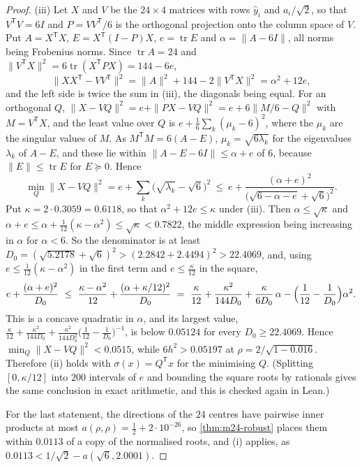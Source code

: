 \documentclass[11pt,reqno]{amsart}
\renewcommand{\_}{\origunderscore\allowbreak}
\numberwithin{equation}{section}
\theoremstyle{plain}
\theoremstyle{definition}
\theoremstyle{remark}
\begin{document}
\begin{proof}
(iii) Let $X$ and $V$ be the $24\times4$ matrices with rows $\hat y_i$ and
$a_i/\sqrt2$, so that $V^{\mathsf T}V=6I$ and $P=VV^{\mathsf T}/6$ is the
orthogonal projection onto the column space of $V$. Put $A=X^{\mathsf T}X$,
$E=X^{\mathsf T}(I-P)X$, $e=\operatorname{tr}E$ and $\alpha=\|A-6I\|$, all
norms being Frobenius norms. Since $\operatorname{tr}A=24$ and
$\|V^{\mathsf T}X\|^2=6\operatorname{tr}(X^{\mathsf T}PX)=144-6e$,
\[
  \|XX^{\mathsf T}-VV^{\mathsf T}\|^2=\|A\|^2+144-2\|V^{\mathsf T}X\|^2
  =\alpha^2+12e ,
\]
and the left side is twice the sum in \textup{(iii)}, the diagonals being
equal. For an orthogonal $Q$, $\|X-VQ\|^2=e+\|PX-VQ\|^2=e+6\|M/6-Q\|^2$ with
$M=V^{\mathsf T}X$, and the least value over $Q$ is
$e+\frac16\sum_k(\mu_k-6)^2$, where the $\mu_k$ are the singular values of
$M$. As $M^{\mathsf T}M=6(A-E)$, $\mu_k=\sqrt{6\lambda_k}$ for the
eigenvalues $\lambda_k$ of $A-E$, and these lie within
$\|A-E-6I\|\le\alpha+e$ of $6$, because $\|E\|\le\operatorname{tr}E$ for
$E\succeq0$. Hence
\[
  \min_Q\|X-VQ\|^2=e+\sum_k\bigl(\sqrt{\lambda_k}-\sqrt6\bigr)^2
  \ \le\ e+\frac{(\alpha+e)^2}{\bigl(\sqrt{6-\alpha-e}+\sqrt6\bigr)^2}.
\]
Put $\kappa=2\cdot0.3059=0.6118$, so that $\alpha^2+12e\le\kappa$ under
\textup{(iii)}. Then $\alpha\le\sqrt\kappa$ and
$\alpha+e\le\alpha+\frac1{12}(\kappa-\alpha^2)\le\sqrt\kappa<0.7822$, the
middle expression being increasing in $\alpha$ for $\alpha<6$. So the
denominator is at least
$D_0=(\sqrt{5.2178}+\sqrt6)^2>(2.2842+2.4494)^2>22.4069$, and, using
$e\le\frac1{12}(\kappa-\alpha^2)$ in the first term and $e\le\frac\kappa{12}$
in the square,
\[
  e+\frac{(\alpha+e)^2}{D_0}
  \ \le\ \frac{\kappa-\alpha^2}{12}+\frac{(\alpha+\kappa/12)^2}{D_0}
  \ =\ \frac\kappa{12}+\frac{\kappa^2}{144D_0}+\frac{\kappa}{6D_0}\,\alpha
  -\Bigl(\frac1{12}-\frac1{D_0}\Bigr)\alpha^2 .
\]
This is a concave quadratic in $\alpha$, and its largest value,
$\frac\kappa{12}+\frac{\kappa^2}{144D_0}
+\frac{\kappa^2}{144D_0^2}\bigl(\frac1{12}-\frac1{D_0}\bigr)^{-1}$, is below
$0.05124$ for every $D_0\ge22.4069$. Hence
$\min_Q\|X-VQ\|^2<0.0515$, while $6h^2>0.05197$ at
$\rho=2/\sqrt{1-0.016}$. Therefore \textup{(ii)} holds with
$\sigma(x)=Q^{\mathsf T}x$ for the minimising $Q$. (Splitting
$[0,\kappa/12]$ into $200$ intervals of $e$ and bounding the square roots by
rationals gives the same conclusion in exact arithmetic, and this is checked
again in Lean.)

For the last statement, the directions of the $24$ centres have pairwise
inner products at most $a(\rho,\rho)=\frac12+2\cdot10^{-26}$, so
\cref{thm:m24-robust} places them within $0.0113$ of a copy of the
normalised roots, and \textup{(i)} applies, as
$0.0113<1/\sqrt2-a(\sqrt6,2.0001)$.
\end{proof}
\end{document}
